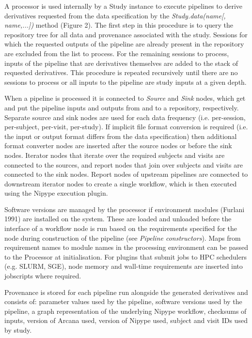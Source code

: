 A processor is used internally by a Study instance to execute pipelines
to derive derivatives requested from the data specification by the
\emph{Study.data(name{[}, name,...{]})} method (Figure 2). The first
step in this procedure is to query the repository tree for all data and
provenance associated with the study. Sessions for which the requested
outputs of the pipeline are already present in the repository are
excluded from the list to process. For the remaining sessions to
process, inputs of the pipeline that are derivatives themselves are
added to the stack of requested derivatives. This procedure is repeated
recursively until there are no sessions to process or all inputs to the
pipeline are study inputs at a given depth.

When a pipeline is processed it is connected to \emph{Source} and
\emph{Sink} nodes, which get and put the pipeline inputs and outputs
from and to a repository, respectively. Separate source and sink nodes
are used for each data frequency (i.e. per-session, per-subject,
per-visit, per-study). If implicit file format conversion is required
(i.e. the input or output format differs from the data specification)
then additional format converter nodes are inserted after the source
nodes or before the sink nodes. Iterator nodes that iterate over the
required subjects and visits are connected to the sources, and report
nodes that join over subjects and visits are connected to the sink
nodes. Report nodes of upstream pipelines are connected to downstream
iterator nodes to create a single workflow, which is then executed using
the Nipype execution plugin.

Software versions are managed by the processor if environment modules
(Furlani 1991) are installed on the system. These are loaded and
unloaded before the interface of a workflow node is run based on the
requirements specified for the node during construction of the pipeline
(see \emph{Pipeline constructors}). Maps from requirement names to
module names in the processing environment can be passed to the
Processor at initialisation. For plugins that submit jobs to HPC
schedulers (e.g. SLURM, SGE), node memory and wall-time requirements are
inserted into jobscripts where required.

Provenance is stored for each pipeline run alongside the generated
derivatives and consists of: parameter values used by the pipeline,
software versions used by the pipeline, a graph representation of the
underlying Nipype workflow, checksums of inputs, version of Arcana used,
version of Nipype used, subject and visit IDs used by study.

